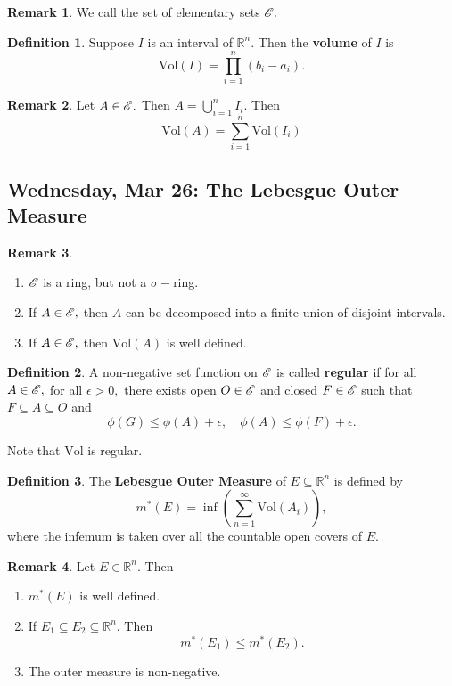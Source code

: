 \documentclass[10pt, oneside]{article}
\newcommand{\bbR}{\mathbb{R}}
\newcommand{\Vol}{\text{Vol}}
\theoremstyle{definition}
\newtheorem{defn}{Definition}
\newtheorem{rem}{Remark}
\begin{document}
\begin{rem}
    We call the set of elementary sets $\cal E.$
\end{rem}
\begin{defn}
    Suppose $I$ is an interval of $\bbR^n.$ Then the \textbf{volume} of $I$ is 
    \[\Vol(I) = \prod_{i=1}^n (b_i - a_i).\]
\end{defn}
\begin{rem}
    Let $A \in \cal E.$ Then $A = \bigcup_{i=1}^n I_i.$ Then 
    \[\Vol(A) = \sum_{i=1}^n \Vol(I_i)\]
\end{rem}

\newpage
\subsection{Wednesday, Mar 26: The Lebesgue Outer Measure}
\begin{rem}
    \begin{enumerate}
        \item $\cal E$ is a ring, but not a $\sigma-$ring.
        \item If $A\in \cal E,$ then $A$ can be decomposed into a finite union of disjoint intervals.
        \item If $A\in \cal E,$ then $\Vol(A)$ is well defined. 
    \end{enumerate}
\end{rem}

\begin{defn}
    A non-negative set function on $\cal E$ is called \textbf{regular} if for all $A\in \cal E,$ for all $\epsilon>0,$ there exists  open $O  \in \cal E$ and closed $F \in \cal E$ such that $F\subseteq A \subseteq O$ and 
    \[\phi(G) \leq \phi(A) + \epsilon, \quad \phi(A) \leq \phi(F)  + \epsilon.\]
\end{defn}
Note that $\Vol$ is regular. 
\begin{defn}
    The \textbf{Lebesgue Outer Measure} of $E\subseteq \bbR^n$ is defined by
    \[m^*(E) = \inf\left(\sum_{n=1}^\infty \Vol(A_i)\right),\] where the infemum is taken over all the countable open covers of $E.$ 
\end{defn}

\begin{rem}
Let $E\in \bbR^n.$ Then
    \begin{enumerate}
        \item $m^*(E)$ is well defined.
        \item If $E_1\subseteq E_2 \subseteq\bbR^n.$ Then 
        \[m^*(E_1) \leq m^*(E_2).\]
        \item The outer measure is non-negative.
    \end{enumerate}
\end{rem}
\end{document}
